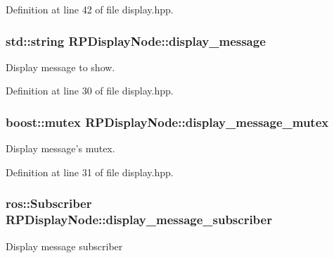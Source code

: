 \-Definition at line 42 of file display.\-hpp.

\hypertarget{class_r_p_display_node_a67384dfa9a2bd68ef5e472fa3bec9d67}{
\subsubsection[{display\-\_\-message}]{\setlength{\rightskip}{0pt plus 5cm}std\-::string {\bf \-R\-P\-Display\-Node\-::display\-\_\-message}}}\label{class_r_p_display_node_a67384dfa9a2bd68ef5e472fa3bec9d67}
\-Display message to show. 

\-Definition at line 30 of file display.\-hpp.

\hypertarget{class_r_p_display_node_a40cb006b8813082cce33e9b39fe06bd5}{
\subsubsection[{display\-\_\-message\-\_\-mutex}]{\setlength{\rightskip}{0pt plus 5cm}boost\-::mutex {\bf \-R\-P\-Display\-Node\-::display\-\_\-message\-\_\-mutex}}}\label{class_r_p_display_node_a40cb006b8813082cce33e9b39fe06bd5}
\-Display message's mutex. 

\-Definition at line 31 of file display.\-hpp.

\hypertarget{class_r_p_display_node_a06fa613f49e68df3feb0a32aea5a6772}{
\subsubsection[{display\-\_\-message\-\_\-subscriber}]{\setlength{\rightskip}{0pt plus 5cm}ros\-::\-Subscriber {\bf \-R\-P\-Display\-Node\-::display\-\_\-message\-\_\-subscriber}}}\label{class_r_p_display_node_a06fa613f49e68df3feb0a32aea5a6772}
\-Display message subscriber 

